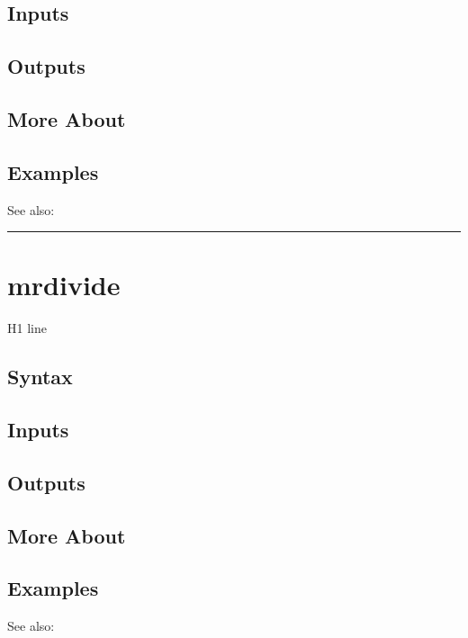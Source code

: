 \documentclass[letterpaper,10pt,english]{sphinxmanual}
\begin{document}
\subsection{Inputs}
\label{classes/time_series/@ts/ts:id381}

\subsection{Outputs}
\label{classes/time_series/@ts/ts:id382}

\subsection{More About}
\label{classes/time_series/@ts/ts:id383}

\subsection{Examples}
\label{classes/time_series/@ts/ts:id384}
See also:


\bigskip\hrule{}\bigskip



\section{mrdivide}
\label{classes/time_series/@ts/ts:mrdivide}\label{classes/time_series/@ts/ts:id385}
H1 line


\subsection{Syntax}
\label{classes/time_series/@ts/ts:id386}

\subsection{Inputs}
\label{classes/time_series/@ts/ts:id387}

\subsection{Outputs}
\label{classes/time_series/@ts/ts:id388}

\subsection{More About}
\label{classes/time_series/@ts/ts:id389}

\subsection{Examples}
\label{classes/time_series/@ts/ts:id390}
See also:
\end{document}
